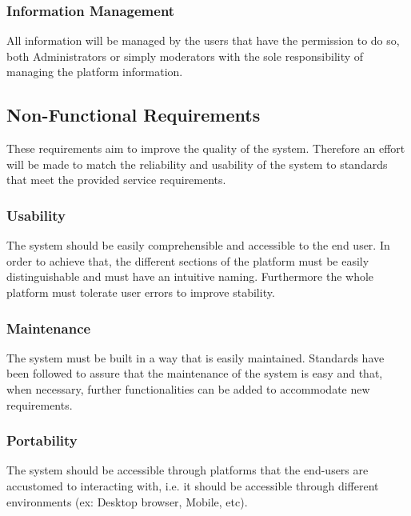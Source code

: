 \documentclass[a4paper,12pt,journal,twoside,compsoc]{PPIEEEtran}
\begin{document}
\subsubsection{Information Management}

All information will be managed by the users that have the permission to do so, both Administrators or simply moderators with the sole responsibility of managing the platform information.

\subsection{Non-Functional Requirements}

These requirements aim to improve the quality of the system. Therefore an effort will be made to match the reliability and usability of the system to standards that meet the provided service requirements.

\subsubsection{Usability}

The system should be easily comprehensible and accessible to the end user. In order to achieve that, the different sections of the platform must be easily distinguishable and must have an intuitive naming. Furthermore the whole platform must tolerate user errors to improve stability.

\subsubsection{Maintenance}

The system must be built in a way that is easily maintained. Standards have been followed to assure that the maintenance of the system is easy and that, when necessary, further functionalities can be added to accommodate new requirements.


\subsubsection{Portability}

The system should be accessible through platforms that the end-users are accustomed to interacting with, i.e. it should be accessible through different environments (ex: Desktop browser, Mobile, etc).

\end{document}

